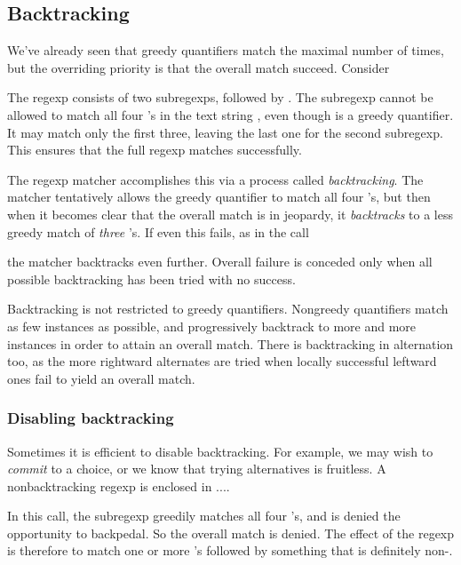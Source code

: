 {\subsection{Backtracking}

We've already seen that greedy quantifiers match
the maximal number of times, but the overriding priority
is that the overall match succeed.  Consider


\n The regexp consists of two subregexps,
 followed by .
The subregexp  cannot be allowed to match
all four 's in the text string , even though
\p{*} is a greedy quantifier.  It may match only the first
three, leaving the last one for the second subregexp.
This ensures that the full regexp matches successfully.

The regexp matcher accomplishes this via a process
called {\em backtracking}.  The matcher
tentatively allows the greedy quantifier
to match all four 's, but then when it becomes
clear that the overall match is in jeopardy, it
{\em backtracks} to a less greedy match of {\em
three} 's.  If even this fails, as in the
call


\n the matcher backtracks even further.  Overall
failure is conceded only when all possible backtracking
has been tried with no success.

Backtracking is not restricted to greedy quantifiers.
Nongreedy quantifiers match as few instances as
possible, and progressively backtrack to more and more
instances in order to attain an overall match.  There
is backtracking in alternation too, as the more
rightward alternates are tried when locally successful
leftward ones fail to yield an overall match.

\subsubsection{Disabling backtracking}

Sometimes it is efficient to disable backtracking.  For
example, we may wish  to  {\em commit} to a choice, or
we know that trying alternatives is fruitless.  A
nonbacktracking regexp is enclosed in ...\p{)}.


In this call, the subregexp  greedily matches
all four 's, and is denied the opportunity to
backpedal.  So the overall match is denied.  The effect
of the regexp is therefore to match one or more 's
followed by something that is definitely non-.

}
